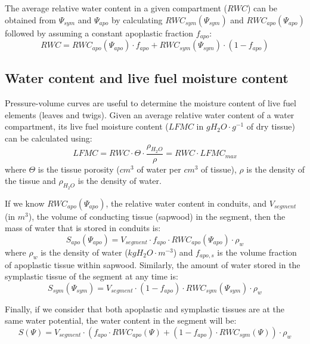 \documentclass[]{book}
\begin{document}
The average relative water content in a given compartment (\(RWC\)) can be obtained from \(\Psi_{sym}\) and \(\Psi_{apo}\) by calculating \(RWC_{sym}(\Psi_{sym})\) and \(RWC_{apo}(\Psi_{apo})\) followed by assuming a constant apoplastic fraction \(f_{apo}\):
\begin{equation}
RWC = RWC_{apo}(\Psi_{apo}) \cdot f_{apo} + RWC_{sym}(\Psi_{sym}) \cdot (1 - f_{apo})
\end{equation}

\hypertarget{water-content-and-live-fuel-moisture-content}{%
\subsection{Water content and live fuel moisture content}\label{water-content-and-live-fuel-moisture-content}}

Pressure-volume curves are useful to determine the moisture content of live fuel elements (leaves and twigs). Given an average relative water content of a water compartment, its live fuel moisture content (\(LFMC\) in \(g H_2O \cdot g^{-1}\) of dry tissue) can be calculated using:
\begin{equation}
LFMC = RWC \cdot \Theta \cdot \frac{\rho_{H_2O}}{\rho} = RWC \cdot LFMC_{max}
\end{equation}
where \(\Theta\) is the tissue porosity (\(cm^3\) of water per \(cm^3\) of tissue), \(\rho\) is the density of the tissue and \(\rho_{H_2O}\) is the density of water.

If we know \(RWC_{apo}(\Psi_{apo})\), the relative water content in conduits, and \(V_{segment}\) (in \(m^3\)), the volume of conducting tissue (sapwood) in the segment, then the mass of water that is stored in conduits is:
\begin{equation}
S_{apo}(\Psi_{apo}) = V_{segment} \cdot f_{apo} \cdot RWC_{apo}(\Psi_{apo}) \cdot \rho_{w}
\end{equation}
where \(\rho_{w}\) is the density of water (\(kgH_2O \cdot m^{-3}\)) and \(f_{apo,s}\) is the volume fraction of apoplastic tissue within sapwood. Similarly, the amount of water stored in the symplastic tissue of the segment at any time is:
\begin{equation}
S_{sym}(\Psi_{sym}) = V_{segment} \cdot (1 - f_{apo}) \cdot RWC_{sym}(\Psi_{sym}) \cdot \rho_{w}
\end{equation}

Finally, if we consider that both apoplastic and symplastic tissues are at the same water potential, the water content in the segment will be:
\begin{equation}
S(\Psi) = V_{segment} \cdot (f_{apo} \cdot RWC_{apo}(\Psi) + (1 - f_{apo}) \cdot RWC_{sym}(\Psi)) \cdot \rho_{w}
\end{equation}
\end{document}
